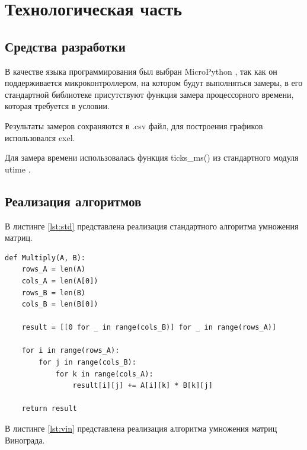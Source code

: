 \chapter{Технологическая часть}

\section{Средства разработки}

В качестве языка программирования был выбран MicroPython \cite{micropython}, так как он поддерживается микроконтроллером, на котором будут выполняться замеры, в его стандартной библиотеке присутствуют функция замера процессорного времени, которая требуется в условии.

Результаты замеров сохраняются в .csv файл, для построения графиков использовался exel.

Для замера времени использовалась функция ticks\_ms() из стандартного модуля utime \cite{micropython-utime}.

\section{Реализация алгоритмов}

В листинге \ref{lst:std} представлена реализация стандартного алгоритма умножения матриц.

\begin{lstlisting}[label=lst:std,caption={Стандартный алгоритм умножения матриц}]
def Multiply(A, B):
    rows_A = len(A)
    cols_A = len(A[0])
    rows_B = len(B)
    cols_B = len(B[0])

    result = [[0 for _ in range(cols_B)] for _ in range(rows_A)]

    for i in range(rows_A):
        for j in range(cols_B):
            for k in range(cols_A):
                result[i][j] += A[i][k] * B[k][j]

    return result
\end{lstlisting}

\clearpage

В листинге \ref{lst:vin} представлена реализация алгоритма умножения матриц Винограда.

